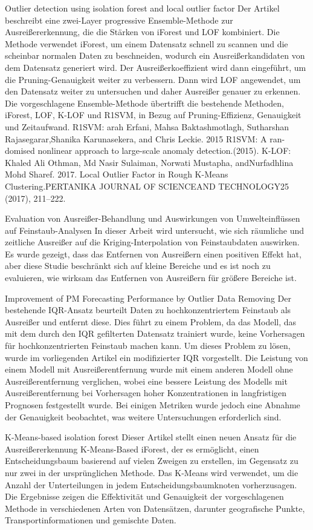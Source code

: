     Outlier detection using isolation forest and local outlier factor
        Der Artikel beschreibt eine zwei-Layer progressive Ensemble-Methode zur Ausreißererkennung, die die Stärken von iForest und LOF kombiniert. Die Methode verwendet iForest, um einem Datensatz schnell zu scannen und die scheinbar normalen Daten zu beschneiden, wodurch ein Ausreißerkandidaten von dem Datensatz generiert wird. Der Ausreißerkoeffizient wird dann eingeführt, um die Pruning-Genauigkeit weiter zu verbessern. Dann wird LOF angewendet, um den Datensatz weiter zu untersuchen und daher Ausreißer genauer zu erkennen. Die vorgeschlagene Ensemble-Methode übertrifft die bestehende Methoden, iForest, LOF, K-LOF und R1SVM, in Bezug auf Pruning-Effizienz, Genauigkeit und Zeitaufwand.
            R1SVM: arah Erfani, Mahsa Baktashmotlagh, Sutharshan Rajasegarar,Shanika Karunasekera, and Chris Leckie. 2015 R1SVM: A ran-domised nonlinear approach to large-scale anomaly detection.(2015).
            K-LOF: Khaled Ali Othman, Md Nasir Sulaiman, Norwati Mustapha, andNurfadhlina Mohd Sharef. 2017. Local Outlier Factor in Rough K-Means Clustering.PERTANIKA JOURNAL OF SCIENCEAND TECHNOLOGY25 (2017), 211–222.

    Evaluation von Ausreißer-Behandlung und Auswirkungen von Umwelteinflüssen auf Feinstaub-Analysen
        In dieser Arbeit wird untersucht, wie sich räumliche und zeitliche Ausreißer auf die Kriging-Interpolation von Feinstaubdaten auswirken. Es wurde gezeigt, dass das Entfernen von Ausreißern einen positiven Effekt hat, aber diese Studie beschränkt sich auf kleine Bereiche und es ist noch zu evaluieren, wie wirksam das Entfernen von Ausreißern für größere Bereiche ist.

    Improvement of PM Forecasting Performance by Outlier Data Removing
        Der bestehende IQR-Ansatz beurteilt Daten zu hochkonzentriertem Feinstaub als Ausreißer und entfernt diese. Dies führt zu einem Problem, da das Modell, das mit dem durch den IQR gefilterten Datensatz trainiert wurde, keine Vorhersagen für hochkonzentrierten Feinstaub machen kann. Um dieses Problem zu lösen, wurde im vorliegenden Artikel ein modifizierter IQR vorgestellt. Die Leistung von einem Modell mit Ausreißerentfernung wurde mit einem anderen Modell ohne Ausreißerentfernung verglichen, wobei eine bessere Leistung des Modells mit Ausreißerentfernung bei Vorhersagen hoher Konzentrationen in langfristigen Prognosen festgestellt wurde. Bei einigen Metriken wurde jedoch eine Abnahme der Genauigkeit beobachtet, was weitere Untersuchungen erforderlich sind.
        
    K-Means-based isolation forest
        Dieser Artikel stellt einen neuen Ansatz für die Ausreißererkennung K-Means-Based iForest, der es ermöglicht, einen Entscheidungsbaum basierend auf vielen Zweigen zu erstellen, im Gegensatz zu nur zwei in der ursprünglichen Methode. Das K-Means wird verwendet, um die Anzahl der Unterteilungen in jedem Entscheidungsbaumknoten vorherzusagen. Die Ergebnisse zeigen die Effektivität und Genauigkeit der vorgeschlagenen Methode in verschiedenen Arten von Datensätzen, darunter geografische Punkte, Transportinformationen und gemischte Daten.